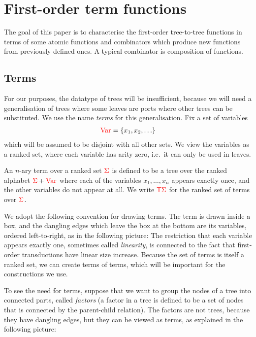 \section{First-order term functions}
The goal of this paper is to characterise the first-order tree-to-tree functions in terms of some atomic functions and combinators which produce new functions from previously defined ones. A typical combinator is composition of functions.

\subsection{Terms}
For our purposes, the datatype of trees will be insufficient, because  we will need a generalisation of trees where some leaves  are ports   where other trees can be substituted. We use the name \emph{terms} for this generalisation. Fix a set of variables
\begin{align*}
    {{\color{red}{\mathrm{Var}}}} = \{x_1,x_2,\ldots\}
\end{align*}
which will be assumed to be disjoint with all other sets.  We view the variables as a ranked set, where each variable has arity zero, i.e.~it can only be used in leaves. 

\begin{definition}[Terms]\label{def:terms}
    An $n$-ary term over a ranked set ${\color{red}{\Sigma}}$ is defined to be a tree over the ranked alphabet ${\color{red}{\Sigma}} + {{\color{red}{\mathrm{Var}}}}$ where each of the  variables $x_1,\ldots,x_n$ appears exactly once,  and the other variables do not appear at all.    We write ${\color{red}{\mathsf T}} {\color{red}{\Sigma}}$ for the ranked set of terms over ${\color{red}{\Sigma}}$. 
\end{definition}
 
We adopt the following convention for drawing terms. The term is drawn inside a box, and the dangling edges which leave the box at the bottom are its variables, ordered left-to-right, as in the following picture: 
 The restriction that each variable appears exactly one, sometimes called \emph{linearity}, is connected to the fact that first-order transductions have linear size increase. Because the set of terms is itself a ranked set,  we can create terms of terms, which will be important for the constructions we use.  

To see the need for terms, suppose that we want to group the nodes of a tree into connected parts, called \emph{factors} (a factor in a tree is defined to be a set of nodes that is connected by the parent-child relation). The factors are not trees, because they have dangling edges, but they can be viewed as terms, as explained in the following picture:
        
